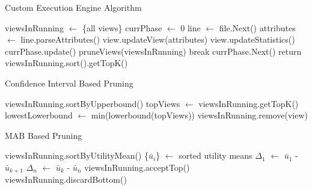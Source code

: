 

\begin{algorithm}
\caption{Custom Execution Engine Algorithm}
\label{algo:custom_exec_engine}
\begin{algorithmic}[1]
\State viewsInRunning $\gets$ \{all views\}
\State currPhase $\gets$ 0
\State line $\gets$ file.Next()
\State attributes $\gets$ line.parseAttributes()
\State view.updateView(attributes)
\State view.updateStatistics()
\EndFor
\State currPhase.update()
\State pruneViews(viewsInRunning)
\State break
\EndIf
\State currPhase.Next()
\EndIf
\EndWhile
\State return viewsInRunning.sort().getTopK()
\end{algorithmic}
\end{algorithm}

\begin{algorithm}
\caption{Confidence Interval Based Pruning}
\label{algo:ci_based_pruning}
\begin{algorithmic}[1]
\State viewsInRunning.sortByUpperbound()
\State topViews $\gets$ viewsInRunning.getTopK()
\State lowestLowerbound $\gets$ min(lowerbound(topViews))
\State viewsInRunning.remove(view)
\EndIf
\EndFor
\end{algorithmic}
\end{algorithm}


\begin{algorithm}
\caption{MAB Based Pruning}
\label{algo:mab_based_pruning}
\begin{algorithmic}[1]
\State viewsInRunning.sortByUtilityMean()
\State \{$\bar{u}_{i}$\} $\gets$ sorted utility means
\State $\Delta_1$ $\gets$ $\bar{u}_{1}$ - $\bar{u}_{k+1}$
\State $\Delta_n$ $\gets$ $\bar{u}_{k}$ - $\bar{u}_{n}$
\State viewsInRunning.acceptTop()
\Else
\State viewsInRunning.discardBottom()
\EndIf
\end{algorithmic}
\end{algorithm}
